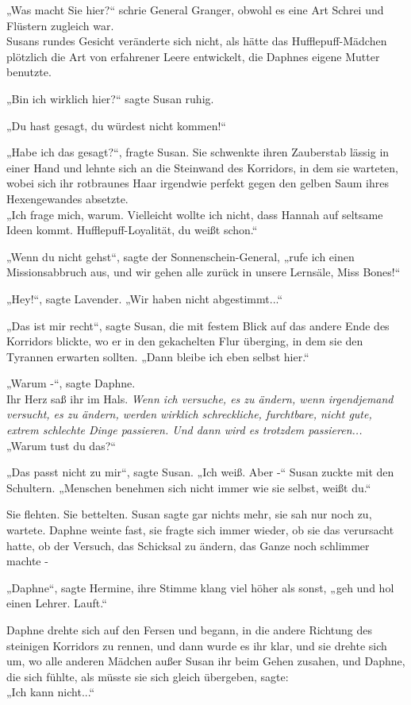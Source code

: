 {„Was macht Sie hier?“ schrie General Granger, obwohl es eine Art Schrei und Flüstern zugleich war.\\ Susans rundes Gesicht veränderte sich nicht, als hätte das Hufflepuff-Mädchen plötzlich die Art von erfahrener Leere entwickelt, die Daphnes eigene Mutter benutzte.

„Bin ich wirklich hier?“ sagte Susan ruhig.

„Du hast gesagt, du würdest nicht kommen!“

„Habe ich das gesagt?“, fragte Susan. Sie schwenkte ihren Zauberstab lässig in einer Hand und lehnte sich an die Steinwand des Korridors, in dem sie warteten, wobei sich ihr rotbraunes Haar irgendwie perfekt gegen den gelben Saum ihres Hexengewandes absetzte.\\ „Ich frage mich, warum. Vielleicht wollte ich nicht, dass Hannah auf seltsame Ideen kommt. Hufflepuff-Loyalität, du weißt schon.“

„Wenn du nicht gehst“, sagte der Sonnenschein-General, „rufe ich einen Missionsabbruch aus, und wir gehen alle zurück in unsere Lernsäle, Miss Bones!“

„Hey!“, sagte Lavender. „Wir haben nicht abgestimmt...“

„Das ist mir recht“, sagte Susan, die mit festem Blick auf das andere Ende des Korridors blickte, wo er in den gekachelten Flur überging, in dem sie den Tyrannen erwarten sollten. „Dann bleibe ich eben selbst hier.“

„Warum -“, sagte Daphne.\\ Ihr Herz saß ihr im Hals. \emph{Wenn ich versuche, es zu ändern, wenn irgendjemand versucht, es zu ändern, werden wirklich schreckliche, furchtbare, nicht gute, extrem schlechte Dinge passieren. Und dann wird es trotzdem passieren...}\\ „Warum tust du das?“

„Das passt nicht zu mir“, sagte Susan. „Ich weiß. Aber -“ Susan zuckte mit den Schultern. „Menschen benehmen sich nicht immer wie sie selbst, weißt du.“

Sie flehten. Sie bettelten. Susan sagte gar nichts mehr, sie sah nur noch zu, wartete. Daphne weinte fast, sie fragte sich immer wieder, ob sie das verursacht hatte, ob der Versuch, das Schicksal zu ändern, das Ganze noch schlimmer machte -

„Daphne“, sagte Hermine, ihre Stimme klang viel höher als sonst, „geh und hol einen Lehrer. Lauft.“

Daphne drehte sich auf den Fersen und begann, in die andere Richtung des steinigen Korridors zu rennen, und dann wurde es ihr klar, und sie drehte sich um, wo alle anderen Mädchen außer Susan ihr beim Gehen zusahen, und Daphne, die sich fühlte, als müsste sie sich gleich übergeben, sagte:\\ „Ich kann nicht...“

}
